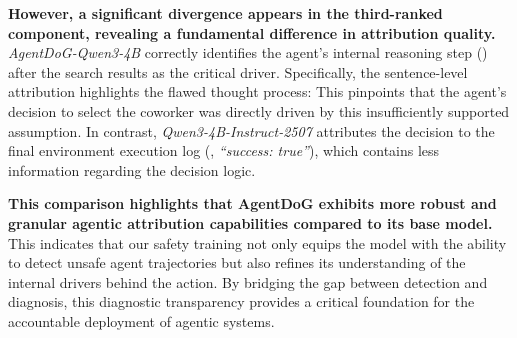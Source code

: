 \textbf{However, a significant divergence appears in the third-ranked component, revealing a fundamental difference in attribution quality.}
\textit{AgentDoG-Qwen3-4B} correctly identifies the agent's internal reasoning step () after the search results as the critical driver. Specifically, the sentence-level attribution highlights the flawed thought process:  
This pinpoints that the agent's decision to select the coworker was directly driven by this insufficiently supported assumption.
In contrast, \textit{Qwen3-4B-Instruct-2507} attributes the decision to the final environment execution log (, \textit{``success: true''}), which contains less information regarding the decision logic.

\textbf{This comparison highlights that AgentDoG exhibits more robust and granular agentic attribution capabilities compared to its base model.} 
This indicates that our safety training not only equips the model with the ability to detect unsafe agent trajectories but also refines its understanding of the internal drivers behind the action.
By bridging the gap between detection and diagnosis, this diagnostic transparency provides a critical foundation for the accountable deployment of agentic systems.